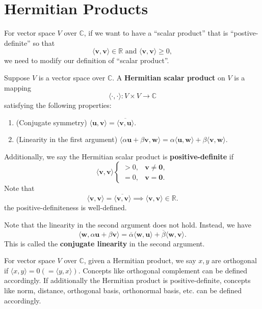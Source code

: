     \section{Hermitian Products}
		For vector space $V$ over $\mathbb{C}$, if we want to have a ``scalar product'' that is ``postive-definite'' so that
		\[
		\langle \bm{v}, \bm{v} \rangle \in \mathbb{R} \text{ and } \langle \bm{v}, \bm{v} \rangle \ge 0,
		\]
		we need to modify our definition of ``scalar product''.
	\begin{definitionenv}
		Suppose $V$ is a vector space over $\mathbb{C}$. A \textbf{Hermitian scalar product} on $V$ is a mapping
		\[
		\langle \cdot, \cdot \rangle : V \times V \to \mathbb{C}
		\]
		satisfying the following properties:
		\begin{enumerate}
			\item (Conjugate symmetry) $\langle \bm{u}, \bm{v} \rangle = \overline{\langle \bm{v}, \bm{u} \rangle}$.
			\item (Linearity in the first argument) $\langle \alpha \bm{u} + \beta \bm{v}, \bm{w} \rangle = \alpha \langle \bm{u}, \bm{w} \rangle + \beta \langle \bm{v}, \bm{w} \rangle$.
		\end{enumerate}
		Additionally, we say the Hermitian scalar product is \textbf{positive-definite} if
		\[
		\langle \bm{v}, \bm{v} \rangle 
		\begin{cases}
		> 0, & \bm{v} \neq \bm{0}, \\
		= 0, & \bm{v} = \bm{0}.
		\end{cases}
		\]
		Note that
		\[
		\langle \bm{v}, \bm{v} \rangle = \overline{\langle \bm{v}, \bm{v} \rangle} \implies \langle \bm{v}, \bm{v} \rangle \in \mathbb{R}.
		\]
		the positive-definiteness is well-defined.
	\end{definitionenv}
	\begin{remarkenv}
		Note that the linearity in the second argument does not hold. Instead, we have
		\[
		\langle \bm{w}, \alpha \bm{u} + \beta \bm{v} \rangle = \overline{\alpha} \langle \bm{w}, \bm{u} \rangle + \overline{\beta} \langle \bm{w}, \bm{v} \rangle.
		\]
		This is called the \textbf{conjugate linearity} in the second argument.
	\end{remarkenv}
	\begin{remarkenv}
		For vector space $V$ over $\mathbb{C}$, given a Hermitian product, we say $x,y$ are orthogonal if $\langle x,y \rangle = 0\left( =\langle y,x \rangle \right)$. Concepts like orthogonal complement can be defined accordingly. If additionally the Hermitian product is positive-definite, concepts like norm, distance, orthogonal basis, orthonormal basis, etc. can be defined accordingly.
	\end{remarkenv}
